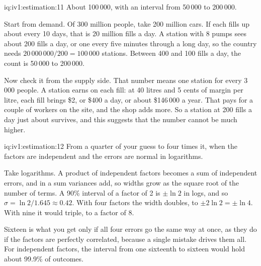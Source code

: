 \begin{solution}{iq:iv1:estimation:11}
About 100\,000, with an interval from 50\,000 to 200\,000.

Start from demand. Of 300 million people, take 200 million cars. If each fills up about every 10 days, that is 20 million fills a day. A station with 8 pumps sees about 200 fills a day, or one every five minutes through a long day, so the country needs $20\,000\,000/200 = 100\,000$ stations. Between 400 and 100 fills a day, the count is 50\,000 to 200\,000.

Now check it from the supply side. That number means one station for every 3\,000 people. A station earns on each fill: at 40 litres and 5 cents of margin per litre, each fill brings \$2, or \$400 a day, or about \$146\,000 a year. That pays for a couple of workers on the site, and the shop adds more. So a station at 200 fills a day just about survives, and this suggests that the number cannot be much higher.

\end{solution}

\begin{solution}{iq:iv1:estimation:12}
From a quarter of your guess to four times it, when the factors are independent and the errors are normal in logarithms.

Take logarithms. A product of independent factors becomes a sum of independent errors, and in a sum variances add, so widths grow as the square root of the number of terms. A 90\% interval of a factor of 2 is $\pm \ln 2$ in logs, and so $\sigma = \ln 2/1.645 \approx 0.42$. With four factors the width doubles, to $\pm 2 \ln 2 = \pm \ln 4$. With nine it would triple, to a factor of 8.

Sixteen is what you get only if all four errors go the same way at once, as they do if the factors are perfectly correlated, because a single mistake drives them all. For independent factors, the interval from one sixteenth to sixteen would hold about 99.9\% of outcomes.

\end{solution}

